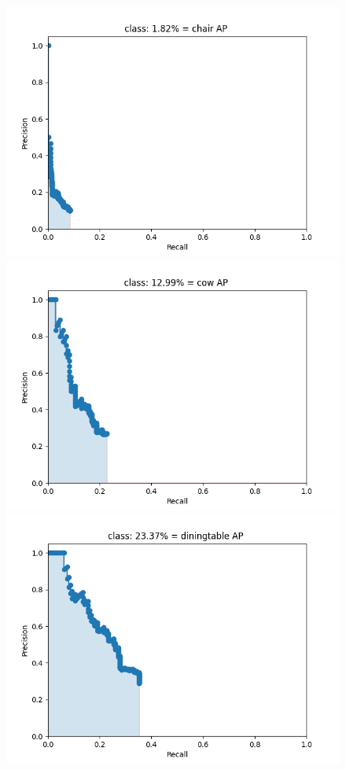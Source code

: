 \documentclass{article}%
\begin{document}
\begin{figure}[H]
    \centering
	\begin{minipage}{0.24\linewidth}
		\centering
		\includegraphics[width=0.9\linewidth]{fast_rcnn/mAP_output/classes/chair.png}
	\end{minipage}
	\begin{minipage}{0.24\linewidth}
		\centering
		\includegraphics[width=0.9\linewidth]{fast_rcnn/mAP_output/classes/cow.png}
	\end{minipage}
    \begin{minipage}{0.24\linewidth}
		\centering
		\includegraphics[width=0.9\linewidth]{fast_rcnn/mAP_output/classes/diningtable.png}

\end{minipage}
\end{figure}
\end{document}
